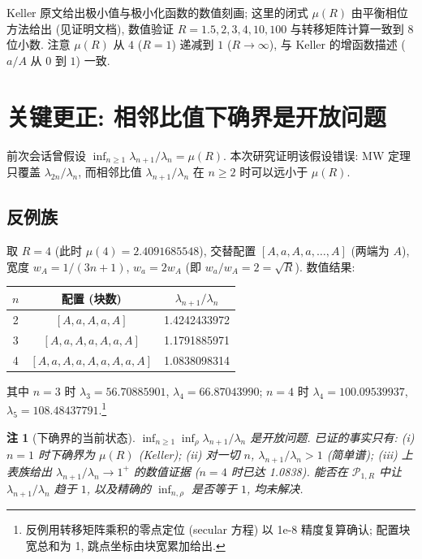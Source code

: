 \documentclass[UTF8]{ctexart}
\newtheorem{remark}[theorem]{注}
\begin{document}
Keller 原文给出极小值与极小化函数的数值刻画; 这里的闭式 $\mu(R)$ 由平衡相位方法给出
(见证明文档), 数值验证 $R = 1.5, 2, 3, 4, 10, 100$ 与转移矩阵计算一致到 8 位小数.
注意 $\mu(R)$ 从 $4$ ($R=1$) 递减到 $1$ ($R \to \infty$), 与 Keller 的增函数描述 ($a/A$ 从 $0$ 到 $1$)
一致.

\section{关键更正: 相邻比值下确界是开放问题}

前次会话曾假设 $\inf_{n\geq 1} \lambda_{n+1}/\lambda_n = \mu(R)$.
本次研究证明该假设错误: MW 定理只覆盖 $\lambda_{2n}/\lambda_n$, 而相邻比值 $\lambda_{n+1}/\lambda_n$
在 $n \geq 2$ 时可以远小于 $\mu(R)$.

\subsection{反例族}

取 $R = 4$ (此时 $\mu(4) = 2.4091685548$), 交替配置 $[A,a,A,a,\dots,A]$ (两端为 $A$),
宽度 $w_A = 1/(3n+1)$, $w_a = 2w_A$ (即 $w_a/w_A = 2 = \sqrt{R}$). 数值结果:

\begin{center}
\begin{tabular}{ccc}
	\toprule
	$n$ & 配置 (块数) & $\lambda_{n+1}/\lambda_n$ \\
	\midrule
	2 & $[A,a,A,a,A]$ & 1.4242433972 \\
	3 & $[A,a,A,a,A,a,A]$ & 1.1791885971 \\
	4 & $[A,a,A,a,A,a,A,a,A]$ & 1.0838098314 \\
	\bottomrule
\end{tabular}
\end{center}

其中 $n = 3$ 时 $\lambda_3 = 56.70885901$, $\lambda_4 = 66.87043990$; $n = 4$ 时
$\lambda_4 = 100.09539937$, $\lambda_5 = 108.48437791$.\footnote{反例用转移矩阵乘积的零点定位 (secular 方程) 以 1e-8 精度复算确认; 配置块宽总和为 1, 跳点坐标由块宽累加给出.}

\begin{remark}[下确界的当前状态]
$\inf_{n\geq 1} \inf_{\rho} \lambda_{n+1}/\lambda_n$ 是开放问题.
已证的事实只有: (i) $n = 1$ 时下确界为 $\mu(R)$ (Keller);
(ii) 对一切 $n$, $\lambda_{n+1}/\lambda_n > 1$ (简单谱);
(iii) 上表族给出 $\lambda_{n+1}/\lambda_n \to 1^+$ 的数值证据 ($n=4$ 时已达 1.0838).
能否在 $\mathcal{P}_{1,R}$ 中让 $\lambda_{n+1}/\lambda_n$ 趋于 $1$, 以及精确的
$\inf_{n,\rho}$ 是否等于 $1$, 均未解决.
\end{remark}
\end{document}
